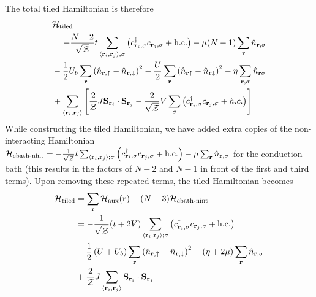 \documentclass[reprint,hidelinks]{revtex4-2}
\begin{document}
The total tiled Hamiltonian is therefore
\begin{equation}\begin{aligned}
	&\mathcal{H}_\text{tiled} \\
	&= -\frac{N-2}{\sqrt\mathcal{Z}}t\sum_{\left<{\bf r}_i, {\bf r}_j\right>,\sigma}\left(c^\dagger_{{\bf r}_i,\sigma}c_{{\bf r}_j,\sigma} + \text{h.c.}\right) - \mu (N-1) \sum_{{\bf r}}\hat n_{{\bf r},\sigma}\\
	&- \frac{1}{2}U_b\sum_{\bf r}\left(\hat n_{{\bf r} , \uparrow} - \hat n_{{\bf r} , \downarrow}\right)^2  -\frac{U}{2}\sum_{{\bf r}}\left(\hat n_{{\bf r} \uparrow} - \hat n_{{\bf r} \downarrow} \right)^2 - \eta\sum_{{\bf r},\sigma} \hat n_{{\bf r}\sigma}\\
	& + \sum_{\left< {\bf r}_i, {\bf r}_j\right>}\left[\frac{2}{\mathcal{Z}}J {\bf S}_{{\bf r}_i}\cdot{\bf S}_{{\bf r}_j} - \frac{2}{\sqrt\mathcal{Z}}V \sum_{\sigma}\left(c^\dagger_{{\bf r}_i,\sigma} c_{{{\bf r}_j},\sigma} + h.c.\right)\right]
\end{aligned}\end{equation}
While constructing the tiled Hamiltonian, we have added extra copies of the non-interacting Hamiltonian \(\mathcal{H}_\text{cbath-nint} = -\frac{1}{\sqrt\mathcal{Z}}t\sum_{\left<{\bf r}_i, {\bf r}_j\right>;\sigma}\left(c^\dagger_{{\bf r}_i,\sigma}c_{{\bf r}_j,\sigma} + \text{h.c.}\right) - \mu \sum_{{\bf r}}\hat n_{{\bf r},\sigma}\) for the conduction bath (this results in the factors of \(N-2\) and \(N-1\) in front of the first and third terms). Upon removing these repeated terms, the tiled Hamiltonian becomes
\begin{equation}\begin{aligned}
	\mathcal{H}_\text{tiled} &= \sum_{{\bf r}}\mathcal{H}_\text{aux}({\bf r}) - (N-3)\mathcal{H}_\text{cbath-nint}\\
							 &= -\frac{1}{\sqrt\mathcal{Z}}(t + 2V)\sum_{\left<{\bf r}_i, {\bf r}_j\right>;\sigma}\left(c^\dagger_{{\bf r}_i,\sigma}c_{{\bf r}_j,\sigma} + \text{h.c.}\right) \\
							 &- \frac{1}{2}\left(U + U_b\right)\sum_{\bf r}\left(\hat n_{{\bf r} , \uparrow} - \hat n_{{\bf r} , \downarrow}\right)^2 - \left(\eta + 2\mu\right) \sum_{{\bf r}}\hat n_{{\bf r},\sigma} \\
							 &+ \frac{2}{\mathcal{Z}}J\sum_{\left< {\bf r}_i, {\bf r}_j\right>} {\bf S}_{{\bf r}_i}\cdot{\bf S}_{{\bf r}_j}
\end{aligned}\end{equation}
\end{document}
